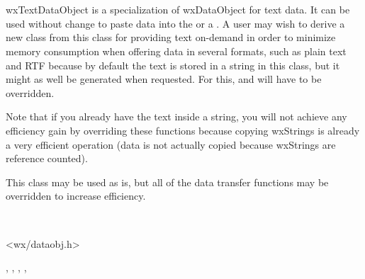 \section{}\label{wxtextdataobject}

wxTextDataObject is a specialization of wxDataObject for text data. It can be
used without change to paste data into the  
or a . A user may wish to derive a new
class from this class for providing text on-demand in order to minimize memory
consumption when offering data in several formats, such as plain text and RTF
because by default the text is stored in a string in this class, but it might
as well be generated when requested. For this, 
 and 
 will have to be overridden.

Note that if you already have the text inside a string, you will not achieve
any efficiency gain by overriding these functions because copying wxStrings is
already a very efficient operation (data is not actually copied because
wxStrings are reference counted).



This class may be used as is, but all of the data transfer functions may be
overridden to increase efficiency.


\\


<wx/dataobj.h>




, 
, 
, 
, 


